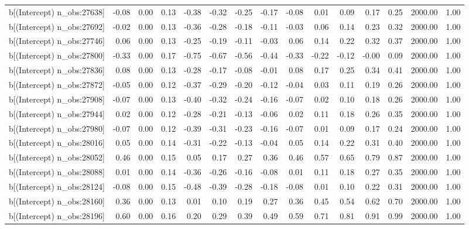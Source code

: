 \begin{table}[ht]
\begin{tabular}{rrrrrrrrrrrrrrr}
  b[(Intercept) n\_obs:27638] & -0.08 & 0.00 & 0.13 & -0.38 & -0.32 & -0.25 & -0.17 & -0.08 & 0.01 & 0.09 & 0.17 & 0.25 & 2000.00 & 1.00 \\ 
  b[(Intercept) n\_obs:27692] & -0.02 & 0.00 & 0.13 & -0.36 & -0.28 & -0.18 & -0.11 & -0.03 & 0.06 & 0.14 & 0.23 & 0.32 & 2000.00 & 1.00 \\ 
  b[(Intercept) n\_obs:27746] & 0.06 & 0.00 & 0.13 & -0.25 & -0.19 & -0.11 & -0.03 & 0.06 & 0.14 & 0.22 & 0.32 & 0.37 & 2000.00 & 1.00 \\ 
  b[(Intercept) n\_obs:27800] & -0.33 & 0.00 & 0.17 & -0.75 & -0.67 & -0.56 & -0.44 & -0.33 & -0.22 & -0.12 & -0.00 & 0.09 & 2000.00 & 1.00 \\ 
  b[(Intercept) n\_obs:27836] & 0.08 & 0.00 & 0.13 & -0.28 & -0.17 & -0.08 & -0.01 & 0.08 & 0.17 & 0.25 & 0.34 & 0.41 & 2000.00 & 1.00 \\ 
  b[(Intercept) n\_obs:27872] & -0.05 & 0.00 & 0.12 & -0.37 & -0.29 & -0.20 & -0.12 & -0.04 & 0.03 & 0.11 & 0.19 & 0.26 & 2000.00 & 1.00 \\ 
  b[(Intercept) n\_obs:27908] & -0.07 & 0.00 & 0.13 & -0.40 & -0.32 & -0.24 & -0.16 & -0.07 & 0.02 & 0.10 & 0.18 & 0.26 & 2000.00 & 1.00 \\ 
  b[(Intercept) n\_obs:27944] & 0.02 & 0.00 & 0.12 & -0.28 & -0.21 & -0.13 & -0.06 & 0.02 & 0.11 & 0.18 & 0.26 & 0.35 & 2000.00 & 1.00 \\ 
  b[(Intercept) n\_obs:27980] & -0.07 & 0.00 & 0.12 & -0.39 & -0.31 & -0.23 & -0.16 & -0.07 & 0.01 & 0.09 & 0.17 & 0.24 & 2000.00 & 1.00 \\ 
  b[(Intercept) n\_obs:28016] & 0.05 & 0.00 & 0.14 & -0.31 & -0.22 & -0.13 & -0.04 & 0.05 & 0.14 & 0.22 & 0.31 & 0.40 & 2000.00 & 1.00 \\ 
  b[(Intercept) n\_obs:28052] & 0.46 & 0.00 & 0.15 & 0.05 & 0.17 & 0.27 & 0.36 & 0.46 & 0.57 & 0.65 & 0.79 & 0.87 & 2000.00 & 1.00 \\ 
  b[(Intercept) n\_obs:28088] & 0.01 & 0.00 & 0.14 & -0.36 & -0.26 & -0.16 & -0.08 & 0.01 & 0.11 & 0.18 & 0.27 & 0.35 & 2000.00 & 1.00 \\ 
  b[(Intercept) n\_obs:28124] & -0.08 & 0.00 & 0.15 & -0.48 & -0.39 & -0.28 & -0.18 & -0.08 & 0.01 & 0.10 & 0.22 & 0.31 & 2000.00 & 1.00 \\ 
  b[(Intercept) n\_obs:28160] & 0.36 & 0.00 & 0.13 & 0.01 & 0.10 & 0.19 & 0.27 & 0.36 & 0.45 & 0.54 & 0.62 & 0.70 & 2000.00 & 1.00 \\ 
  b[(Intercept) n\_obs:28196] & 0.60 & 0.00 & 0.16 & 0.20 & 0.29 & 0.39 & 0.49 & 0.59 & 0.71 & 0.81 & 0.91 & 0.99 & 2000.00 & 1.00 \\ 

\end{tabular}
\end{table}
